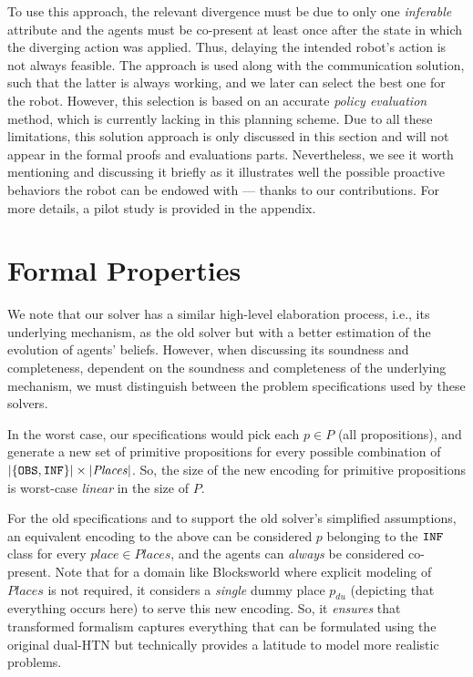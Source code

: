 \documentclass[letterpaper]{article} %
\begin{document}
To use this approach, the relevant divergence must be due to only one \textit{inferable} attribute and the agents must be co-present at least once after the state in which the diverging action was applied. 
Thus, delaying the intended robot's action is not always feasible. 
The approach is used along with the communication solution, such that the latter is always working, and we later can select the best one for the robot. 
However, this selection is based on an accurate \textit{policy evaluation} method, which is currently lacking in this planning scheme.
Due to all these limitations, this solution approach is only discussed
in this section and will not appear in the formal proofs and evaluations parts. 
Nevertheless, we see it worth mentioning and discussing it briefly as it illustrates well the possible proactive behaviors the robot can be endowed with --- thanks to our contributions. 
For more details, a pilot study is provided in the appendix.




\section{Formal Properties}
We note that our solver has a similar high-level elaboration process, i.e., its underlying mechanism, as the old solver but with a better estimation of the evolution of agents' beliefs.  
However, when discussing its soundness and completeness, dependent on the soundness and completeness of the underlying mechanism, we must distinguish between the problem specifications used by these solvers. 

In the worst case, our specifications would pick each $p \in P$ (all propositions), and generate a new set of primitive propositions for every possible combination of $|\{\texttt{OBS},\texttt{INF}\}| \times |\mathit{Places}|$. 
So, the size of the new encoding for primitive propositions is worst-case \textit{linear} in the size of $P$.

For the old specifications and to support the old solver's simplified assumptions, an equivalent encoding to the above can be considered $p$ belonging to the $\texttt{INF}$ class for every $place \in \mathit{Places}$, and the agents can \textit{always} be considered co-present.  
Note that for a domain like Blocksworld where explicit modeling of $\mathit{Places}$ is not required, it considers a \textit{single} dummy place $p_{du}$ (depicting that everything occurs here) to serve this new encoding. So, it \textit{ensures} that transformed formalism captures everything that can be formulated using the original dual-HTN but technically provides a latitude to model more realistic problems. 
\end{document}
